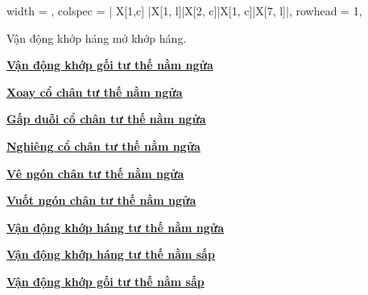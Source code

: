 \begin{longtblr}[
    caption = {Thủ thuật xoa bóp vùng chi dưới},
]{
    width = \textwidth,
    colspec = {| X[1,c] |X[1, l]|X[2, c]|X[1, c]|X[7, l]|},
    rowhead = 1,
}
{        Vận động khớp háng mở khớp háng.

        \hyperlink{target:day_dau_goi}{\textbf{Vận động khớp gối tư thế nằm ngửa}}

        \hyperlink{target:xoay_co_chan}{\textbf{Xoay cổ chân tư thế nằm ngửa}}

        \hyperlink{target:gap_duoi_co_chan}{\textbf{Gấp duỗi cổ chân tư thế nằm ngửa}}

        \hyperlink{target:nghieng_co_chan}{\textbf{Nghiêng cổ chân tư thế nằm ngửa}}
        
        \hyperlink{target:ve_ngon_chan}{\textbf{Vê ngón chân tư thế nằm ngửa}}

        \hyperlink{target:vuot_ngon_chan}{\textbf{Vuốt ngón chân tư thế nằm ngửa}}

        \hyperlink{target:van_dong_khop_hang_tu_the_nam_ngua}{\textbf{Vận động khớp háng tư thế nằm ngửa}}

        \hyperlink{target:van_dong_khop_hang_tu_the_nam_sap}{\textbf{Vận động khớp háng tư thế nằm sấp}}

        \hyperlink{target:van_dong_khop_goi_tu_the_nam_sap}{\textbf{Vận động khớp gối tư thế nằm sấp}}
    }
    \\ \hline
\end{longtblr}
